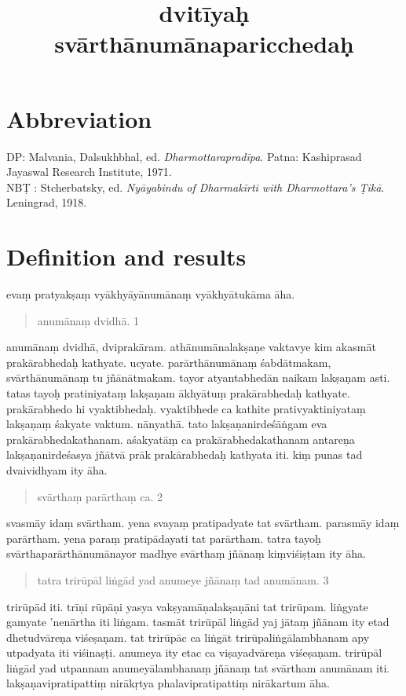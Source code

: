 \documentclass{article}
\title{dvitīyaḥ svārthānumānaparicchedaḥ}
\author{}
\date{}
\begin{document}
\maketitle
\section*{Abbreviation}
DP: Malvania, Dalsukhbhal, ed. \textit{Dharmottarapradīpa}. Patna: Kashiprasad Jayaswal Research Institute, 1971.\\
NB\d{T} : Stcherbatsky, ed. \textit{Nyāyabindu of Dharmakīrti with Dharmottara's Ṭikā}. Leningrad, 1918.
\baselineskip
\beginnumbering

\section{Definition and results}
\pstart
{}evaṃ pratyakṣaṃ vyākhyāyānumānaṃ vyākhyātukāma āha. 

 \begin{quote}
 anumānaṃ dvidhā. 1 
 \end{quote}

anumānaṃ dvidhā, dviprakāram. athānumānalakṣaṇe vaktavye kim akasmāt prakārabhedaḥ kathyate. ucyate. parārthānumānaṃ śabdātmakam, svārthānumānaṃ tu jñānātmakam. tayor atyantabhedān naikam lakṣaṇam asti. tatas tayoḥ pratiniyataṃ lakṣaṇam ākhyātuṃ prakārabhedaḥ kathyate. prakārabhedo hi vyaktibhedaḥ. vyaktibhede ca kathite prativyaktiniyataṃ lakṣaṇaṃ śakyate vaktum. nānyathā. tato lakṣaṇanirdeśāṅgam eva prakārabhedakathanam. aśakyatāṃ ca prakārabhedakathanam antareṇa lakṣaṇanirdeśasya jñātvā prāk prakārabhedaḥ kathyata iti.
\pend
\pstart
{}kiṃ punas tad dvaividhyam ity āha. 

\begin{quote}
svārthaṃ parārthaṃ ca. 2
\end{quote}

svasmāy idaṃ svārtham. yena svayaṃ pratipadyate tat svārtham. parasmāy idaṃ parārtham. yena paraṃ pratipādayati tat parārtham.
\pend
\pstart
tatra tayoḥ svārthaparārthānumānayor madhye svārthaṃ jñānaṃ kiṃviśiṣṭam ity āha. 

\begin{quote}
tatra trirūpāl liṅgād yad anumeye jñānaṃ tad anumānam. 3
\end{quote}

trirūpād iti. trīṇi rūpāṇi yasya vakṣyamāṇalakṣaṇāni tat trirūpam. liṅgyate gamyate 'nenārtha iti liṅgam. tasmāt trirūpāl liṅgād yaj jātaṃ jñānam ity etad dhetudvāreṇa viśeṣaṇam. tat trirūpāc ca liṅgāt trirūpaliṅgālambhanam apy utpadyata iti viśinaṣṭi. anumeya ity etac ca viṣayadvāreṇa viśeṣaṇam.
\pend
\pstart
trirūpāl liṅgād yad utpannam anumeyālambhanaṃ jñānaṃ tat svārtham anumānam iti.
\pend
\pstart
 lakṣaṇavipratipattiṃ nirākṛtya phalavipratipattiṃ nirākartum āha. 
\end{document}
